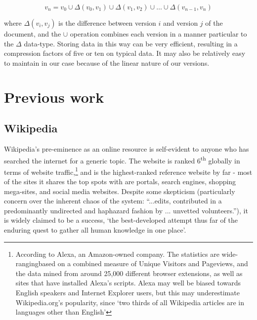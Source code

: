 \documentclass[a4paper,11pt,twoside,notitlepage]{article}
\newcommand{\super}[1]{\textsuperscript{#1}}
\begin{document}
        $$v_n = v_0 \cup {\Delta}(v_0,v_1) \cup {\Delta}(v_1,v_2)
        \cup \dots \cup {\Delta}(v_{n-1},v_n) $$

        where ${\Delta}(v_i,v_j)$ is the difference between version
        $i$ and version $j$ of the document, and the $\cup$ operation
        combines each version in a manner particular to the $\Delta$
        data-type. Storing data in this way can be very efficient,
        resulting in a compression factors of five or ten on typical
        data.\cite{Macdonald2000} It may also be relatively easy to
        maintain in our case because of the linear nature of our
        versions.  


 
        \section{Previous work}
        \subsection{Wikipedia}
        Wikipedia's pre-eminence as an online resource is self-evident
        to anyone who has searched the internet for a generic
        topic. The website is ranked 6\super{th} globally in terms of
        website traffic,\footnote{According to Alexa, an Amazon-owned
          company. The statistics are wide-rangingbased on a combined
          measure of Unique Visitors and Pageviews, and the data mined
          from around 25,000 different browser extensions, as well as
          sites that have installed Alexa's
          scripts.\cite{Alexa-about2014} Alexa may well be biased
          towards English speakers and Internet Explorer users, but
          this may underestimate Wikipedia.org's popularity, since
          `two thirds of all Wikipedia articles are in languages other
          than English'\cite{wikimedia-noteonalexa}} and is the
        highest-ranked reference website by far - most of the sites it
        shares the top spots with are portals, search engines,
        shopping mega-sites, and social media
        websites.\cite{Alexa-topsites2014} Despite some skepticism
        (particularly concern over the inherent chaos of the system:
        ``...edits, contributed in a predominantly undirected and
        haphazard fashion by ... unvetted
        volunteers.''\cite{Wilkinson2007}), it is widely
        claimed to be a success, `the best-developed attempt thus
        far of the enduring quest to gather all human knowledge in one
        place'\cite{Mesgari2014}.
\end{document}
